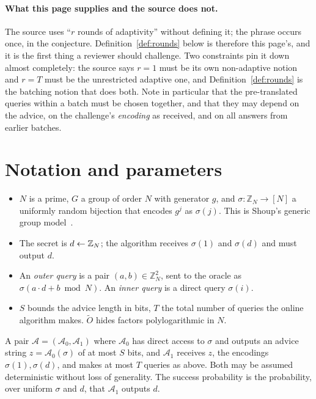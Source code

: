 \documentclass{aicr-conjecture}
\newcommand{\Adv}{\mathcal{A}}
\newcommand{\Z}{\mathbb{Z}}
\newcommand{\Ot}{\widetilde{O}}
\begin{document}
\paragraph{What this page supplies and the source does not.}
The source uses ``$r$ rounds of adaptivity'' without defining it; the
phrase occurs once, in the conjecture. Definition~\ref{def:rounds}
below is therefore this page's, and it is the first thing a reviewer
should challenge. Two constraints pin it down almost completely: the
source says $r = 1$ must be its own non-adaptive notion and $r = T$
must be the unrestricted adaptive one, and Definition~\ref{def:rounds}
is the batching notion that does both. Note in particular that the
pre-translated queries within a batch must be chosen together, and that
they may depend on the advice, on the challenge's \emph{encoding} as
received, and on all answers from earlier batches.

\section{Notation and parameters}\label{sec:notation}

\begin{itemize}[nosep]
  \item $N$ is a prime, $G$ a group of order $N$ with generator $g$,
    and $\sigma : \Z_{N} \to [N]$ a uniformly random bijection that
    encodes $g^{j}$ as $\sigma(j)$. This is Shoup's generic group
    model~\cite{Sho97}.
  \item The secret is $d \sample \Z_{N}$; the algorithm receives
    $\sigma(1)$ and $\sigma(d)$ and must output $d$.
  \item An \emph{outer query} is a pair $(a,b) \in \Z_{N}^{2}$, sent to
    the oracle as $\sigma(a \cdot d + b \bmod N)$. An \emph{inner
    query} is a direct query $\sigma(i)$.
  \item $S$ bounds the advice length in bits, $T$ the total number of
    queries the online algorithm makes. $\Ot$ hides factors
    polylogarithmic in $N$.
\end{itemize}

\begin{definition}\label{def:st}
A pair $\Adv = (\Adv_{0}, \Adv_{1})$ where $\Adv_{0}$ has direct access
to $\sigma$ and outputs an advice string $z = \Adv_{0}(\sigma)$ of at
most $S$ bits, and $\Adv_{1}$ receives $z$, the encodings
$\sigma(1), \sigma(d)$, and makes at most $T$ queries as above. Both
may be assumed deterministic without loss of generality. The success
probability is the probability, over uniform $\sigma$ and $d$, that
$\Adv_{1}$ outputs $d$.
\end{definition}
\end{document}
